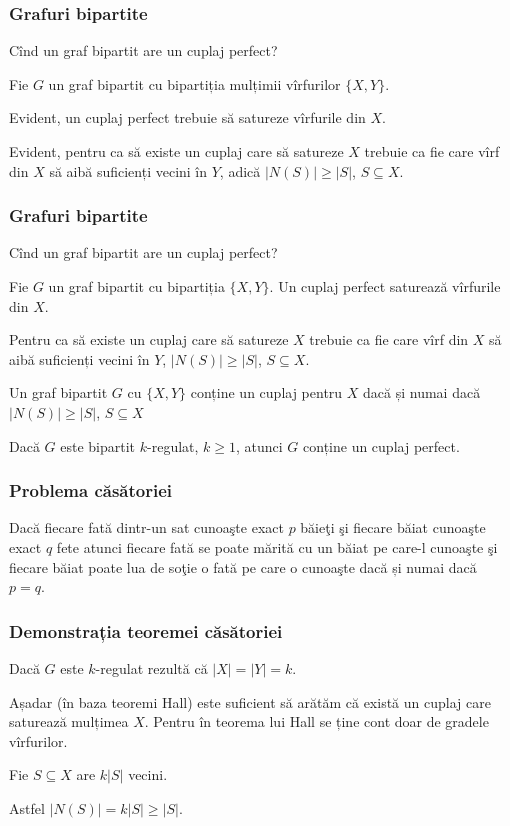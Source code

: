 \begin{frame}
  \frametitle{Grafuri bipartite}

\alert{Cînd un graf bipartit are un cuplaj perfect?}\pause

Fie $G$ un graf bipartit cu bipartiția mulțimii vîrfurilor $\{X,Y\}$. \pause

Evident, un cuplaj perfect trebuie să satureze vîrfurile din $X$.\pause

Evident, pentru ca să existe un cuplaj care să satureze $X$ trebuie ca fie care vîrf din $X$ să aibă suficienți vecini în $Y$, adică  
$|N(S)|\geq |S|$, $S\subseteq X$.



\end{frame}


\begin{frame}
  \frametitle{Grafuri bipartite}

Cînd un graf bipartit are un cuplaj perfect?\pause

Fie $G$ un graf bipartit cu bipartiția $\{X,Y\}$. Un cuplaj perfect saturează vîrfurile din $X$.\pause

Pentru ca să existe un cuplaj care să satureze $X$ trebuie ca fie care vîrf din $X$ să aibă suficienți vecini în $Y$, 
$|N(S)|\geq |S|$, $S\subseteq X$.\pause

\begin{theorem}[Hall]
Un graf bipartit $G$ cu $\{X,Y\}$ conține un cuplaj pentru $X$ dacă și numai dacă  $|N(S)|\geq |S|$, $S\subseteq X$
\end{theorem}\pause

\begin{corollary}
Dacă $G$ este bipartit $k$-regulat, $k\geq 1$, atunci $G$ conține un cuplaj perfect. 
\end{corollary}


\end{frame}


\begin{frame}
  \frametitle{Problema căsătoriei}

Dacă fiecare fată dintr-un sat cunoaşte exact $p$ băieţi şi fiecare băiat cunoaşte exact $q$ fete atunci fiecare fată se poate mărită cu un băiat pe care-l cunoaşte şi fiecare băiat poate lua de soţie o fată pe care o cunoaşte dacă și numai dacă $p=q$.

\end{frame}

\begin{frame}
  \frametitle{Demonstrația teoremei căsătoriei}

Dacă $G$ este $k$-regulat rezultă că $|X|=|Y|=k$.\pause

Așadar (în baza teoremi Hall) este suficient să arătăm că există un cuplaj care saturează mulțimea $X$.
Pentru în teorema lui Hall se ține cont doar de gradele vîrfurilor.\pause

Fie $S\subseteq X$ are $k|S|$ vecini.\pause

Astfel $|N(S)|=k|S|\geq |S|$.

\end{frame}


